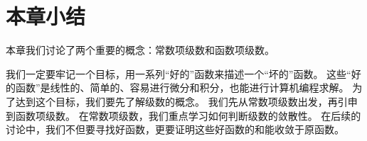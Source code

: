 \section{本章小结}

本章我们讨论了两个重要的概念：常数项级数和函数项级数。

我们一定要牢记一个目标，用一系列“好的”函数来描述一个“坏的”函数。
这些“好的函数”是线性的、简单的、容易进行微分和积分，也能进行计算机编程求解。
为了达到这个目标，我们要先了解级数的概念。
我们先从常数项级数出发，再引申到函数项级数。
在常数项级数，我们重点学习如何判断级数的敛散性。
在后续的讨论中，我们不但要寻找好函数，更要证明这些好函数的和能收敛于原函数。




